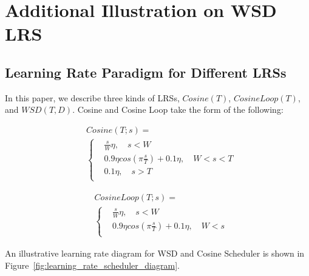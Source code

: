\section{Additional Illustration on WSD LRS}
\subsection{Learning Rate Paradigm for Different LRSs}
\label{app:lrsequ}
In this paper, we describe three kinds of LRSs, $Cosine(T)$, $CosineLoop(T)$, and $WSD(T, D)$. 
Cosine and Cosine Loop take the form of the following:

\begin{figure}[htbp]
    \centering
    \begin{minipage}{0.47\linewidth}
        \begin{equation*}
    \begin{aligned}
    & Cosine(T; s) = \\
    & \begin{cases}
       & \frac{s}{W} \eta, \quad s<W \\
       & 0.9\eta cos(\pi \frac{s}{T}) + 0.1\eta, \quad W < s < T \\
       & 0.1\eta,\quad  s > T \\
    \end{cases}
\end{aligned}
        \end{equation*}
    \end{minipage}
    \hfill %
    \begin{minipage}{0.52\linewidth}
             \begin{equation*}
    \begin{aligned}
    & CosineLoop(T; s) = \\
    & \begin{cases}
       & \frac{s}{W} \eta, \quad s<W \\
       & 0.9\eta cos(\pi \frac{s}{T}) + 0.1\eta, \quad W < s  \\
    \end{cases}
\end{aligned}
        \end{equation*}
    \end{minipage}
\end{figure}


An illustrative learning rate diagram for WSD and Cosine Scheduler is shown in Figure~\ref{fig:learning_rate_scheduler_diagram}.


